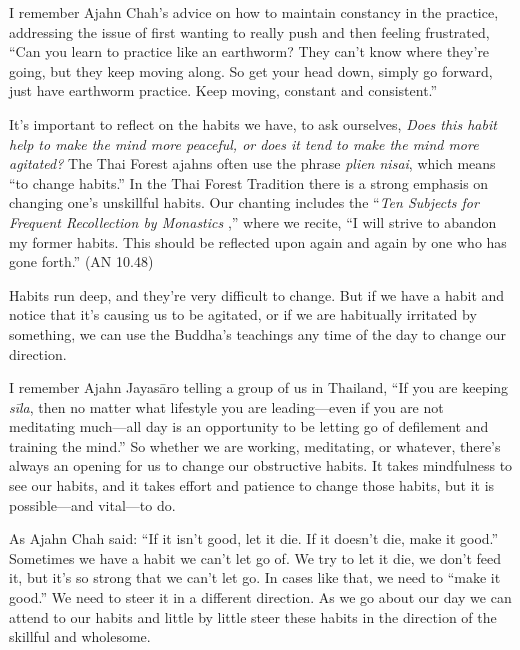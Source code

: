 I remember Ajahn Chah's advice on how to maintain constancy in the 
practice, addressing the issue of first wanting to really push and then 
feeling frustrated, ``Can you learn to practice like an earthworm? They 
can't know where they're going, but they keep moving along. So get your 
head down, simply go forward, just have earthworm practice. Keep 
moving, constant and consistent.''


It's important to reflect on the habits we have, to ask ourselves, 
\emph{Does this habit help to make the mind more peaceful, or does it 
tend to make the mind more agitated?} The Thai Forest ajahns often use 
the phrase \emph{plien nisai}, which means ``to change habits.'' In the 
Thai Forest Tradition there is a strong emphasis on changing one's 
unskillful habits. Our chanting includes the ``\emph{Ten Subjects for 
Frequent Recollection by Monastics} ,'' where we recite, ``I will 
strive to abandon my former habits. This should be reflected upon again 
and again by one who has gone forth.'' (AN 10.48)

Habits run deep, and they're very difficult to change. But if we have a 
habit and notice that it's causing us to be agitated, or if we are 
habitually irritated by something, we can use the Buddha's teachings 
any time of the day to change our direction.

I remember Ajahn Jayasāro telling a group of us in Thailand, ``If you 
are keeping \emph{sīla}, then no matter what lifestyle you are 
leading---even if you are not meditating much---all day is an 
opportunity to be letting go of defilement and training the mind.'' So 
whether we are working, meditating, or whatever, there's always an 
opening for us to change our obstructive habits. It takes mindfulness 
to see our habits, and it takes effort and patience to change those 
habits, but it is possible---and vital---to do.

As Ajahn Chah said: ``If it isn't good, let it die. If it doesn't die, 
make it good.'' Sometimes we have a habit we can't let go of. We try to 
let it die, we don't feed it, but it's so strong that we can't let go. 
In cases like that, we need to ``make it good.'' We need to steer it in 
a different direction. As we go about our day we can attend to our 
habits and little by little steer these habits in the direction of the 
skillful and wholesome.


